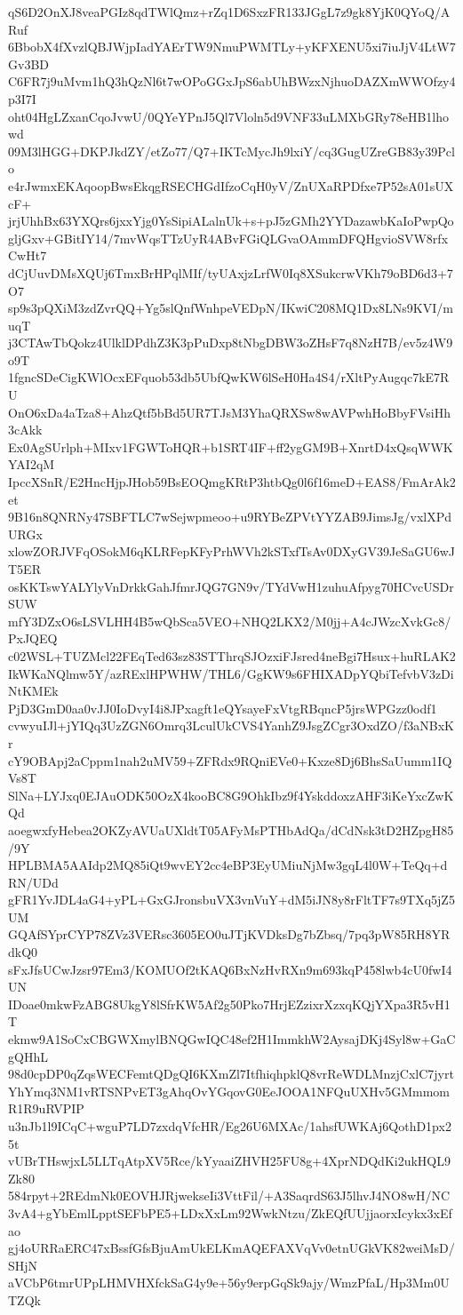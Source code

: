 qS6D2OnXJ8veaPGIz8qdTWlQmz+rZq1D6SxzFR133JGgL7z9gk8YjK0QYoQ/ARuf
6BbobX4fXvzlQBJWjpIadYAErTW9NmuPWMTLy+yKFXENU5xi7iuJjV4LtW7Gv3BD
C6FR7j9uMvm1hQ3hQzNl6t7wOPoGGxJpS6abUhBWzxNjhuoDAZXmWWOfzy4p3I7I
oht04HgLZxanCqoJvwU/0QYeYPnJ5Ql7Vloln5d9VNF33uLMXbGRy78eHB1lhowd
09M3lHGG+DKPJkdZY/etZo77/Q7+IKTcMycJh9lxiY/cq3GugUZreGB83y39Pclo
e4rJwmxEKAqoopBwsEkqgRSECHGdIfzoCqH0yV/ZnUXaRPDfxe7P52sA01sUXcF+
jrjUhhBx63YXQrs6jxxYjg0YsSipiALalnUk+s+pJ5zGMh2YYDazawbKaIoPwpQo
gljGxv+GBitIY14/7mvWqsTTzUyR4ABvFGiQLGvaOAmmDFQHgvioSVW8rfxCwHt7
dCjUuvDMsXQUj6TmxBrHPqlMIf/tyUAxjzLrfW0Iq8XSukcrwVKh79oBD6d3+7O7
sp9s3pQXiM3zdZvrQQ+Yg5slQnfWnhpeVEDpN/IKwiC208MQ1Dx8LNs9KVI/muqT
j3CTAwTbQokz4UlklDPdhZ3K3pPuDxp8tNbgDBW3oZHsF7q8NzH7B/ev5z4W9o9T
1fgncSDeCigKWlOcxEFquob53db5UbfQwKW6lSeH0Ha4S4/rXltPyAugqc7kE7RU
OnO6xDa4aTza8+AhzQtf5bBd5UR7TJsM3YhaQRXSw8wAVPwhHoBbyFVsiHh3cAkk
Ex0AgSUrlph+MIxv1FGWToHQR+b1SRT4IF+ff2ygGM9B+XnrtD4xQsqWWKYAI2qM
IpccXSnR/E2HncHjpJHob59BsEOQmgKRtP3htbQg0l6f16meD+EAS8/FmArAk2et
9B16n8QNRNy47SBFTLC7wSejwpmeoo+u9RYBeZPVtYYZAB9JimsJg/vxlXPdURGx
xlowZORJVFqOSokM6qKLRFepKFyPrhWVh2kSTxfTsAv0DXyGV39JeSaGU6wJT5ER
osKKTswYALYlyVnDrkkGahJfmrJQG7GN9v/TYdVwH1zuhuAfpyg70HCvcUSDrSUW
mfY3DZxO6sLSVLHH4B5wQbSca5VEO+NHQ2LKX2/M0jj+A4cJWzcXvkGc8/PxJQEQ
c02WSL+TUZMcl22FEqTed63sz83STThrqSJOzxiFJsred4neBgi7Hsux+huRLAK2
IkWKaNQlmw5Y/azRExlHPWHW/THL6/GgKW9s6FHIXADpYQbiTefvbV3zDiNtKMEk
PjD3GmD0aa0vJJ0IoDvyI4i8JPxagft1eQYsayeFxVtgRBqncP5jrsWPGzz0odf1
cvwyuIJl+jYIQq3UzZGN6Omrq3LculUkCVS4YanhZ9JsgZCgr3OxdZO/f3aNBxKr
cY9OBApj2aCppm1nah2uMV59+ZFRdx9RQniEVe0+Kxze8Dj6BhsSaUumm1IQVs8T
SlNa+LYJxq0EJAuODK50OzX4kooBC8G9OhkIbz9f4YskddoxzAHF3iKeYxcZwKQd
aoegwxfyHebea2OKZyAVUaUXldtT05AFyMsPTHbAdQa/dCdNsk3tD2HZpgH85/9Y
HPLBMA5AAIdp2MQ85iQt9wvEY2cc4eBP3EyUMiuNjMw3gqL4l0W+TeQq+dRN/UDd
gFR1YvJDL4aG4+yPL+GxGJronsbuVX3vnVuY+dM5iJN8y8rFltTF7s9TXq5jZ5UM
GQAfSYprCYP78ZVz3VERsc3605EO0uJTjKVDksDg7bZbsq/7pq3pW85RH8YRdkQ0
sFxJfsUCwJzsr97Em3/KOMUOf2tKAQ6BxNzHvRXn9m693kqP458lwb4cU0fwI4UN
IDoae0mkwFzABG8UkgY8lSfrKW5Af2g50Pko7HrjEZzixrXzxqKQjYXpa3R5vH1T
ekmw9A1SoCxCBGWXmylBNQGwIQC48ef2H1ImmkhW2AysajDKj4Syl8w+GaCgQHhL
98d0cpDP0qZqsWECFemtQDgQI6KXmZl7ItfhiqhpklQ8vrReWDLMnzjCxlC7jyrt
YhYmq3NM1vRTSNPvET3gAhqOvYGqovG0EeJOOA1NFQuUXHv5GMmmomR1R9uRVPIP
u3nJb1l9ICqC+wguP7LD7zxdqVfcHR/Eg26U6MXAc/1ahsfUWKAj6QothD1px25t
vUBrTHswjxL5LLTqAtpXV5Rce/kYyaaiZHVH25FU8g+4XprNDQdKi2ukHQL9Zk80
584rpyt+2REdmNk0EOVHJRjwekseIi3VttFil/+A3SaqrdS63J5lhvJ4NO8wH/NC
3vA4+gYbEmlLpptSEFbPE5+LDxXxLm92WwkNtzu/ZkEQfUUjjaorxIcykx3xEfao
gj4oURRaERC47xBssfGfsBjuAmUkELKmAQEFAXVqVv0etnUGkVK82weiMsD/SHjN
aVCbP6tmrUPpLHMVHXfckSaG4y9e+56y9erpGqSk9ajy/WmzPfaL/Hp3Mm0UTZQk
